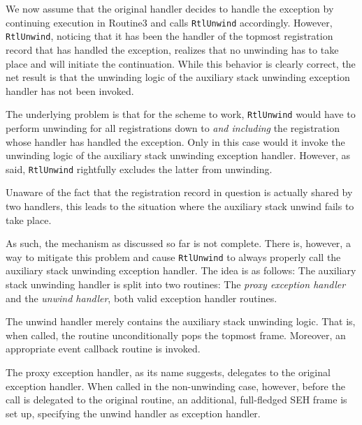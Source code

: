 We now assume that the original handler decides to handle the exception by continuing
execution in Routine3 and calls \verb|RtlUnwind| accordingly. 
However, \verb|RtlUnwind|, noticing that it has been the handler
of the topmost registration record that has handled the exception, 
realizes that no unwinding has to take place and will initiate
the continuation. While this behavior is clearly correct, the net result is
that the unwinding logic of the auxiliary stack unwinding exception handler has 
not been invoked. 

The underlying problem is that for the scheme to work, \verb|RtlUnwind| would
have to perform unwinding for all registrations down to \emph{and including}
the registration whose handler has handled the exception. Only in this case would
it invoke the unwinding logic of the auxiliary stack unwinding exception handler. However, as said,
\verb|RtlUnwind| rightfully excludes the latter from unwinding. 

Unaware of the fact that the registration record in question is actually
shared by two handlers, this leads to the situation where the auxiliary 
stack unwind fails to take place.

As such, the mechanism as discussed so far is not complete. There 
is, however, a way to mitigate this problem and cause \verb|RtlUnwind|
to always properly call the auxiliary stack unwinding exception handler. The
idea is as follows: The auxiliary stack unwinding handler is split
into two routines: The \emph{proxy exception handler} and the 
\emph{unwind handler}, both valid exception handler routines.

The unwind handler merely contains the auxiliary stack unwinding logic. That is,
when called, the routine unconditionally pops the topmost frame. Moreover, an appropriate
event callback routine is invoked. 

The proxy exception handler, as its name suggests, delegates to the original
exception handler. When called in the non-unwinding case, however, before the call is delegated to the 
original routine, an additional, full-fledged SEH frame is set up, specifying
the unwind handler as exception handler.

